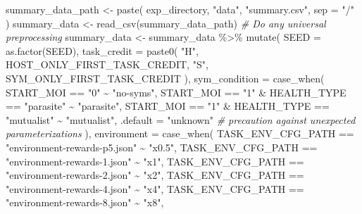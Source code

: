 \documentclass[
]{book}
\newenvironment{Shaded}{\begin{snugshade}}{\end{snugshade}}
\newcommand{\AttributeTok}[1]{\textcolor[rgb]{0.77,0.63,0.00}{#1}}
\newcommand{\CommentTok}[1]{\textcolor[rgb]{0.56,0.35,0.01}{\textit{#1}}}
\newcommand{\FunctionTok}[1]{\textcolor[rgb]{0.00,0.00,0.00}{#1}}
\newcommand{\NormalTok}[1]{#1}
\newcommand{\OtherTok}[1]{\textcolor[rgb]{0.56,0.35,0.01}{#1}}
\newcommand{\SpecialCharTok}[1]{\textcolor[rgb]{0.00,0.00,0.00}{#1}}
\newcommand{\StringTok}[1]{\textcolor[rgb]{0.31,0.60,0.02}{#1}}
\begin{document}
\begin{Shaded}
\begin{Highlighting}[]
\NormalTok{summary\_data\_path }\OtherTok{\textless{}{-}} \FunctionTok{paste}\NormalTok{(}
\NormalTok{  exp\_directory,}
  \StringTok{"data"}\NormalTok{,}
  \StringTok{"summary.csv"}\NormalTok{,}
  \AttributeTok{sep =} \StringTok{"/"}
\NormalTok{)}
\NormalTok{summary\_data }\OtherTok{\textless{}{-}} \FunctionTok{read\_csv}\NormalTok{(summary\_data\_path)}
\CommentTok{\# Do any universal preprocessing}
\NormalTok{summary\_data }\OtherTok{\textless{}{-}}\NormalTok{ summary\_data }\SpecialCharTok{\%\textgreater{}\%}
  \FunctionTok{mutate}\NormalTok{(}
    \AttributeTok{SEED =} \FunctionTok{as.factor}\NormalTok{(SEED),}
    \AttributeTok{task\_credit =} \FunctionTok{paste0}\NormalTok{(}
      \StringTok{"H"}\NormalTok{, HOST\_ONLY\_FIRST\_TASK\_CREDIT,}
      \StringTok{"S"}\NormalTok{, SYM\_ONLY\_FIRST\_TASK\_CREDIT}
\NormalTok{    ),}
    \AttributeTok{sym\_condition =} \FunctionTok{case\_when}\NormalTok{(}
\NormalTok{      START\_MOI }\SpecialCharTok{==} \StringTok{"0"} \SpecialCharTok{\textasciitilde{}} \StringTok{"no{-}syms"}\NormalTok{,}
\NormalTok{      START\_MOI }\SpecialCharTok{==} \StringTok{"1"} \SpecialCharTok{\&}\NormalTok{ HEALTH\_TYPE }\SpecialCharTok{==} \StringTok{"parasite"} \SpecialCharTok{\textasciitilde{}} \StringTok{"parasite"}\NormalTok{,}
\NormalTok{      START\_MOI }\SpecialCharTok{==} \StringTok{"1"} \SpecialCharTok{\&}\NormalTok{ HEALTH\_TYPE }\SpecialCharTok{==} \StringTok{"mutualist"} \SpecialCharTok{\textasciitilde{}} \StringTok{"mutualist"}\NormalTok{,}
      \AttributeTok{.default =} \StringTok{"unknown"} \CommentTok{\# precaution against unexpected parameterizations}
\NormalTok{    ),}
    \AttributeTok{environment =} \FunctionTok{case\_when}\NormalTok{(}
\NormalTok{      TASK\_ENV\_CFG\_PATH }\SpecialCharTok{==} \StringTok{"environment{-}rewards{-}p5.json"} \SpecialCharTok{\textasciitilde{}} \StringTok{"x0.5"}\NormalTok{,}
\NormalTok{      TASK\_ENV\_CFG\_PATH }\SpecialCharTok{==} \StringTok{"environment{-}rewards{-}1.json"} \SpecialCharTok{\textasciitilde{}} \StringTok{"x1"}\NormalTok{,}
\NormalTok{      TASK\_ENV\_CFG\_PATH }\SpecialCharTok{==} \StringTok{"environment{-}rewards{-}2.json"} \SpecialCharTok{\textasciitilde{}} \StringTok{"x2"}\NormalTok{,}
\NormalTok{      TASK\_ENV\_CFG\_PATH }\SpecialCharTok{==} \StringTok{"environment{-}rewards{-}4.json"} \SpecialCharTok{\textasciitilde{}} \StringTok{"x4"}\NormalTok{,}
\NormalTok{      TASK\_ENV\_CFG\_PATH }\SpecialCharTok{==} \StringTok{"environment{-}rewards{-}8.json"} \SpecialCharTok{\textasciitilde{}} \StringTok{"x8"}\NormalTok{,}

\end{Highlighting}
\end{Shaded}
\end{document}
